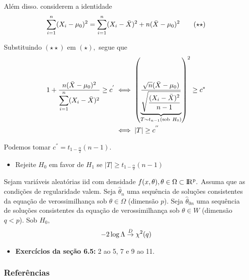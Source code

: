 \documentclass[12pt]{beamer}
\begin{document}
\begin{frame}{}
\begin{block}{}
\justifying
Além disso. considerem a identidade
\begin{align*}
    {\displaystyle \sum_{i=1}^{n}} (X_{i}-\mu_{0})^{2}={\displaystyle \sum_{i=1}^{n}} (X_{i}-\Bar{X})^{2}+n(\Bar{X}-\mu_{0})^{2}\qquad (\star\star)
\end{align*}
\end{block}
\pause
\begin{block}{}
\justifying
Substituindo $(\star\star)$ em $(\star),$ segue que 
\begin{align*}
    1+\dfrac{n(\Bar{X}-\mu_{0})^{2}}{{\displaystyle \sum_{i=1}^{n}} (X_{i}-\Bar{X})^{2}}\geq c^{'}&\iff 
    \left(\underbrace{\dfrac{\sqrt{n}(\Bar{X}-\mu_{0})}{\sqrt{\dfrac{(X_{i}-\Bar{X})^{2}}{n-1}}}}_{T\sim t_{n-1}(\text{sob}~H_{0})}\right)^{2}\geq c^{*}\\
    &\iff |T|\geq c^{''}
\end{align*}
\end{block}
\end{frame}

\begin{frame}{}
\begin{block}{}
\justifying
Podemos tomar $c^{''}=t_{1-\frac{\alpha}{2}}(n-1).$
\begin{itemize}
    \item Rejeite $H_{0}$ em favor de $H_{1}$ se $|T|\geq t_{1-\frac{\alpha}{2}}(n-1)$
\end{itemize}
\end{block}
\end{frame}

\begin{frame}{}
\begin{Teorema}
\justifying
Sejam \seqX variáveis aleatórias iid com densidade $f(x,\theta),\theta\in\Omega\subset\rm I\!R^{p}.$ Assuma que as condições de regularidade valem. Seja $\hat{\theta}_{n}$ uma sequência de soluções consistentes da equação de verossimilhança sob $\theta\in \Omega$ (dimensão $p$). Seja $\hat{\theta}_{0n}$ uma sequência de soluções consistentes da equação de verossimilhança sob $\theta\in W$ (dimensão $q<p$). Sob $H_{0},$
\begin{align*}
    -2\log{\Lambda}\overset{D}{\rightarrow} \chi^{2}(q)
\end{align*}
\end{Teorema}
\end{frame}

\begin{frame}{\Home}
\begin{block}{}
\justifying

\begin{itemize}
    \item \textbf{Exercícios da seção 6.5:} 2 ao 5, 7 e 9 ao 11.
\end{itemize}
\end{block}
\end{frame}

\begin{frame}[allowframebreaks]
\frametitle{\bf Referências}
\printbibliography
\end{frame}
\end{document}
